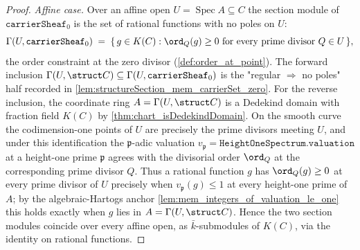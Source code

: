 \begin{proof}
  \emph{Affine case.} Over an affine open
  \(U = \operatorname{Spec} A \subseteq C\) the section module of
  \(\texttt{carrierSheaf}_0\) is the set of rational functions with no poles on
  \(U\):
  \[
    \Gamma(U, \texttt{carrierSheaf}_0) \;=\;
    \{\, g \in K(C) : \ord_Q(g) \geq 0 \text{ for every prime divisor }
    Q \in U \,\},
  \]
  the order constraint at the zero divisor (\cref{def:order_at_point}). The
  forward inclusion \(\Gamma(U, \struct C) \subseteq \Gamma(U,
  \texttt{carrierSheaf}_0)\) is the "regular \(\Rightarrow\) no poles" half
  recorded in \cref{lem:structureSection_mem_carrierSet_zero}. For the reverse
  inclusion, the coordinate ring \(A = \Gamma(U, \struct C)\) is a Dedekind
  domain with fraction field \(K(C)\) by \cref{thm:chart_isDedekindDomain}. On
  the smooth curve the codimension-one points of \(U\) are precisely the prime
  divisors meeting \(U\), and under this identification the \(\mathfrak p\)-adic
  valuation \(v_{\mathfrak p} = \texttt{HeightOneSpectrum.valuation}\) at a
  height-one prime \(\mathfrak p\) agrees with the divisorial order
  \(\ord_Q\) at the corresponding prime divisor \(Q\). Thus a rational function
  \(g\) has \(\ord_Q(g) \ge 0\) at every prime divisor of \(U\) precisely when
  \(v_{\mathfrak p}(g) \le 1\) at every height-one prime of \(A\); by the
  algebraic-Hartogs anchor \cref{lem:mem_integers_of_valuation_le_one} this
  holds exactly when \(g\) lies in \(A = \Gamma(U, \struct C)\). Hence the two
  section modules coincide over every affine open, as \(\bar k\)-submodules of
  \(K(C)\), via the identity on rational functions.


\end{proof}
